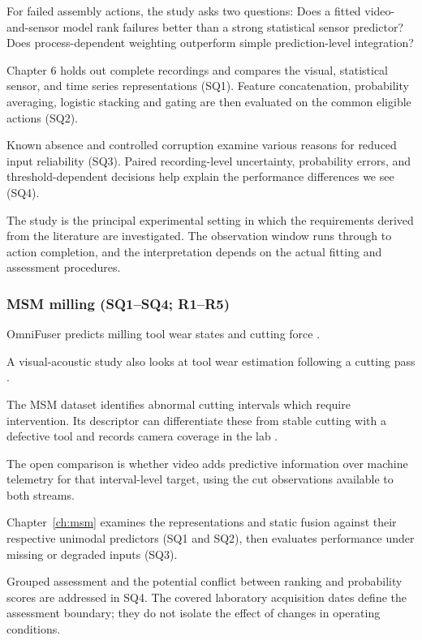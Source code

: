 For failed assembly actions, the study asks two questions: Does a fitted video-and-sensor model rank
failures better than a strong statistical sensor predictor? Does process-dependent weighting
outperform simple prediction-level integration?

Chapter 6 holds out complete recordings and compares the visual, statistical sensor, and time series
representations (SQ1). Feature concatenation, probability averaging, logistic stacking and gating
are then evaluated on the common eligible actions (SQ2).

Known absence and controlled corruption examine various reasons for reduced input reliability (SQ3).
Paired recording-level uncertainty, probability errors, and threshold-dependent decisions help
explain the performance differences we see (SQ4).

The study is the principal experimental setting in which the requirements derived from the
literature are investigated. The observation window runs through to action completion, and the
interpretation depends on the actual fitting and assessment procedures.

\subsubsection*{MSM milling (SQ1--SQ4; R1--R5)}

OmniFuser predicts milling tool wear states and cutting force \citep[PDF p.~11, Tables~IV--V]{P021}.

A visual-acoustic study also looks at tool wear estimation following a cutting pass \citep[PDF
p.~24, Table~1]{P045}.

The MSM dataset identifies abnormal cutting intervals which require intervention. Its descriptor can
differentiate these from stable cutting with a defective tool and records camera coverage in the lab
\citep{Kim2026MSM}.

The open comparison is whether video adds predictive information over machine telemetry for that
interval-level target, using the cut observations available to both streams.

Chapter~\ref{ch:msm} examines the representations and static fusion against their respective
unimodal predictors (SQ1 and SQ2), then evaluates performance under missing or degraded inputs
(SQ3).

Grouped assessment and the potential conflict between ranking and probability scores are addressed
in SQ4. The covered laboratory acquisition dates define the assessment boundary; they do not isolate
the effect of changes in operating conditions.


